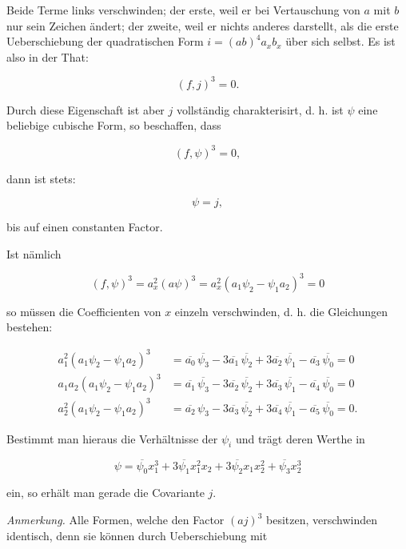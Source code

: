 Beide Terme links verschwinden; der erste, weil er bei Vertauschung
von $a$ mit $b$ nur sein Zeichen ändert; der zweite, weil er nichts anderes
 darstellt, als die erste Ueberschiebung der quadratischen Form
$i = (ab)^4 a_x b_x$ über sich selbst. Es ist also in der That:

\[ (f, j)^3 = 0. \]

Durch diese Eigenschaft ist aber $j$ vollständig charakterisirt, d. h.
ist $\psi$ eine beliebige cubische Form, so beschaffen, dass

\[ (f, \psi)^3 = 0, \]

dann ist stets:

\[ \psi = j, \]

bis auf einen constanten Factor.

Ist nämlich

\[ (f, \psi)^3 = a_x^2 (a\psi)^3 = a_x^2 (a_1 \psi_2 - \psi_1 a_2)^3 = 0 \]



so müssen die Coefficienten von $x$ einzeln verschwinden, d. h.
die Gleichungen bestehen:

\[
\begin{aligned}
a_1^2 (a_1 \psi_2 - \psi_1 a_2)^3 &= \overline{a_0}\, \overline{\psi_3} - 3 \overline{a_1}\, \overline{\psi_2} + 3 \overline{a_2}\, \overline{\psi_1} - \overline{a_3}\, \overline{\psi_0} = 0 \\
a_1 a_2 (a_1 \psi_2 - \psi_1 a_2)^3 &= \overline{a_1}\, \overline{\psi_3} - 3 \overline{a_2}\, \overline{\psi_2} + 3 \overline{a_3}\, \overline{\psi_1} - \overline{a_4}\, \overline{\psi_0} = 0 \\
a_2^2 (a_1 \psi_2 - \psi_1 a_2)^3 &= \overline{a_2}\, \psi_3 - 3 \overline{a_3}\, \overline{\psi_2} + 3 \overline{a_4}\, \overline{\psi_1} - \overline{a_5}\, \overline{\psi_0} = 0. %
\end{aligned}
\]

Bestimmt man hieraus die Verhältnisse der $\psi_i$ und trägt deren
Werthe in

\[ \psi = \overline{\psi_0} x_1^3 + 3 \overline{\psi_1} x_1^2 x_2 + 3 \overline{\psi_2} x_1 x_2^2 + \overline{\psi_3} x_2^3 \]

ein, so erhält man gerade die Covariante $j$.

\textit{Anmerkung.} Alle Formen, welche den Factor $(aj)^3$ besitzen, verschwinden
 identisch, denn sie können durch Ueberschiebung mit

